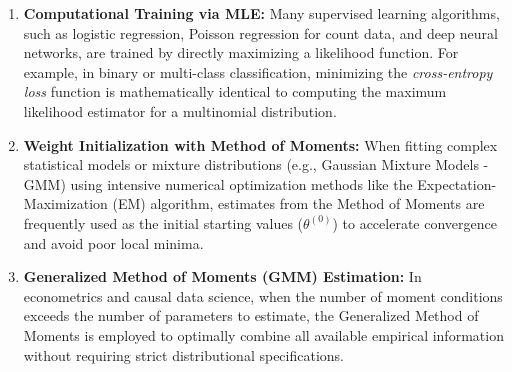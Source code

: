 \begin{enumerate}
	\item \textbf{Computational Training via MLE:} Many supervised learning algorithms, such as logistic regression, Poisson regression for count data, and deep neural networks, are trained by directly maximizing a likelihood function. For example, in binary or multi-class classification, minimizing the \emph{cross-entropy loss} function is mathematically identical to computing the maximum likelihood estimator for a multinomial distribution.

	\item \textbf{Weight Initialization with Method of Moments:} When fitting complex statistical models or mixture distributions (e.g., Gaussian Mixture Models - GMM) using intensive numerical optimization methods like the Expectation-Maximization (EM) algorithm, estimates from the Method of Moments are frequently used as the initial starting values ($\theta^{(0)}$) to accelerate convergence and avoid poor local minima.

	\item \textbf{Generalized Method of Moments (GMM) Estimation:} In econometrics and causal data science, when the number of moment conditions exceeds the number of parameters to estimate, the Generalized Method of Moments is employed to optimally combine all available empirical information without requiring strict distributional specifications.
\end{enumerate}
